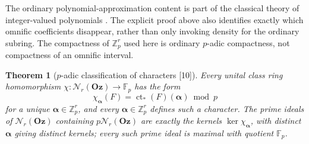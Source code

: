 \documentclass[11pt,letterpaper]{article}
\numberwithin{equation}{section}
\newtheorem{theorem}{Theorem}[section]
\theoremstyle{definition}
\theoremstyle{remark}
\theoremstyle{plain}
\newcommand{\Oz}{\mathbf{Oz}}
\newcommand{\Z}{\mathbb Z}
\newcommand{\F}{\mathbb F}
\newcommand{\ct}{\operatorname{ct}}
\newcommand{\Num}{\mathscr N}
\newcommand{\src}[1]{\textup{\textsf{[#1]}}}
\begin{document}
The ordinary polynomial-approximation content is part of the classical theory of
integer-valued polynomials \cite{CC}. The explicit proof above also identifies exactly
which omnific coefficients disappear, rather than only invoking density for the ordinary
subring. The compactness of $\Z_p^r$ used here is ordinary $p$-adic compactness, not
compactness of an omnific interval.

\begin{theorem}[$p$-adic classification of characters \src{10}]
\label{osq:pm:thm:characters}
Every unital class ring homomorphism $\chi:\Num_r(\Oz)\to\F_p$ has the form
\begin{equation}\label{osq:pm:eq:character}
 \chi_{\boldsymbol\alpha}(F)=\ct_*(F)(\boldsymbol\alpha)\bmod p
\end{equation}
for a unique $\boldsymbol\alpha\in\Z_p^r$, and every $\boldsymbol\alpha\in\Z_p^r$ defines
such a character. The prime ideals of $\Num_r(\Oz)$ containing $p\Num_r(\Oz)$ are exactly
the kernels $\ker\chi_{\boldsymbol\alpha}$, with distinct $\boldsymbol\alpha$ giving
distinct kernels; every such prime ideal is maximal with quotient $\F_p$.
\end{theorem}
\end{document}
